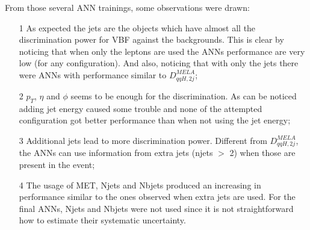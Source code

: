 From those several ANN trainings, some observations were drawn:
\begin{itemize}
	\item[1] As expected the jets are the objects which have almost all the discrimination power for VBF against the backgrounds. This is clear by noticing that when only the leptons are used the ANNs performance are very low (for any configuration). And also, noticing that with only the jets there were ANNs with performance similar to $D_{qqH,2j}^{MELA}$;
	\item[2] $p_{T}$, $\eta$ and $\phi$ seems to be enough for the discrimination. As can be noticed adding jet energy caused some trouble and none of the attempted configuration got better performance than when not using the jet energy;
	\item[3] Additional jets lead to more discrimination power. Different from $D_{qqH,2j}^{MELA}$, the ANNs can use information from extra jets (njets $>$ 2) when those are present in the event;
	\item[4] The usage of MET, Njets and Nbjets produced an increasing in performance similar to the ones observed when extra jets are used. For the final ANNs, Njets and Nbjets were not used since it is not straightforward how to estimate their systematic uncertainty.
\end{itemize}

